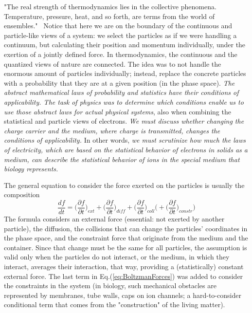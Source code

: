 "The real strength of thermodynamics lies in the collective phenomena. Temperature, pressure,
heat, and so forth, are terms from the world of ensembles."~\cite{HeimburgPhysikOfNerves:2009}
Notice that here we are on the boundary of the continuous and
particle-like views of a system: we select the particles as if we were
handling a continuum, but calculating their position and momentum individually,
under the exertion of a jointly defined force.
In thermodynamics, the continuous and the quantized views of nature
are connected. The idea was to not handle the enormous amount of particles individually; instead, replace the concrete particles
with a probability that they are at a given position (in the phase space). \textit{The abstract mathematical laws of probability and statistics
have their conditions of applicability. The task of physics was to 
determine which conditions enable us to use those abstract laws 
for actual physical systems}, also when combining the statistical and particle views of electrons. \textit{We must discuss
whether changing the charge carrier and the medium, where charge is transmitted, changes the
conditions of applicability.} In other words,
\textit{we must scrutinize how much the laws of electricity, which are based on the statistical behavior of electrons in solids as a medium,
can describe the statistical behavior of ions in the special medium that biology represents.}



The general equation to consider the force exerted on the particles is usually the composition
\begin{equation}
	\frac{df}{dt} = \biggl( \frac{\partial f}{\partial t}\biggr)_{ext}
	+ \biggl( \frac{\partial f}{\partial t}\biggr)_{diff}
	+ \biggl( \frac{\partial f}{\partial t}\biggr)_{coll}
	\biggl(	+ \biggl( \frac{\partial f}{\partial t}\biggr)_{constr}\biggr)
	\label{eq:BoltzmanForces}
\end{equation}
\noindent
The formula considers an external force (essential: not exerted by another particle), the diffusion, the collisions that can change the particles' coordinates in the phase space, and the constraint force that originate from the medium and the container. Since that change must be the same for all particles,
the assumption is valid only when the particles do not interact,
or the medium, in which they interact, averages their interaction, 
that way, providing a (statistically) constant external force.
The last term in Eq.(\ref{eq:BoltzmanForces}) was added to consider the constraints in the system (in biology, such mechanical obstacles are represented by membranes, tube walls, caps on ion channels; a hard-to-consider conditional term that comes from the "construction" of the living matter).

